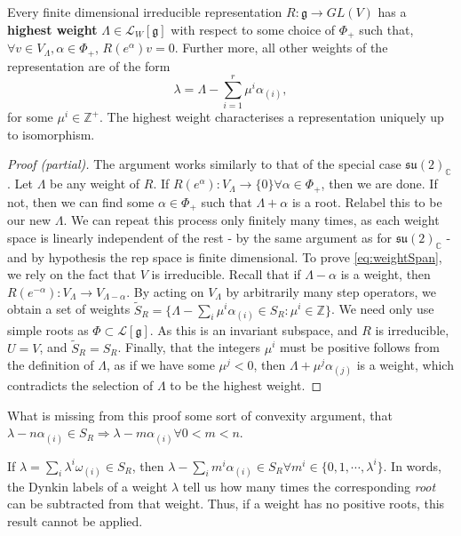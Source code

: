\documentclass[11pt,fleqn]{article}
\renewenvironment{prop}{\begin{pBox}\begin{propT}}{\end{propT}\end{pBox}}
\begin{document}
\begin{prop}
	Every finite dimensional irreducible representation $R:\mathfrak{g} \to GL(V)$ has a \textbf{highest weight} $\Lambda \in \mathcal{L}_W[\mathfrak{g}]$ with respect to some choice of $\Phi_+$ such that, $\forall v \in V_{\Lambda}, \alpha \in \Phi_+$, $R(e^\alpha) v = 0$. Further more, all other weights of the representation are of the form
		\begin{equation}\label{eq:weightSpan}
			\lambda = \Lambda - \sum_{i=1}^r \mu^i \alpha_{(i)},
		\end{equation}
	for some $\mu^i \in \mathbb{Z}^+$. The highest weight characterises a representation uniquely up to isomorphism.
\end{prop}
\begin{proof}[Proof (partial)]
	The argument works similarly to that of the special case $\mathfrak{su}(2)_\mathbb{C}$. Let $\Lambda$ be any weight of $R$. If $R(e^\alpha): V_\Lambda \to \{ 0\} \forall \alpha \in \Phi_+$, then we are done. If not, then we can find some $\alpha \in \Phi_+$ such that $\Lambda + \alpha$ is a root. Relabel this to be our new $\Lambda$. We can repeat this process only finitely many times, as each weight space is linearly independent of the rest - by the same argument as for $\mathfrak{su}(2)_\mathbb{C}$ - and by hypothesis the rep space is finite dimensional. To prove \eqref{eq:weightSpan}, we rely on the fact that $V$ is irreducible. Recall that if $\Lambda - \alpha$ is a weight, then $R(e^{-\alpha}) : V_\Lambda \to V_{\Lambda - \alpha}$. By acting on $V_\Lambda$ by arbitrarily many step operators, we obtain a set of weights $\tilde{S}_R = \{ \Lambda - \sum_i \mu^i \alpha_{(i)} \in S_R : \mu^i \in \mathbb{Z} \}$. We need only use simple roots as $\Phi \subset \mathcal{L}[\mathfrak{g}]$. As this is an invariant subspace, and $R$ is irreducible, $U = V$, and $\tilde{S}_R = S_R$. Finally, that the integers $\mu^i$ must be positive follows from the definition of $\Lambda$, as if we have some $\mu^j < 0$, then $\Lambda + \mu^j \alpha_{(j)}$ is a weight, which contradicts the selection of $\Lambda$ to be the highest weight.
\end{proof}
\begin{remark}
	What is missing from this proof some sort of convexity argument, that $\lambda - n \alpha_{(i)} \in S_R \Rightarrow \lambda - m \alpha_{(i)} \forall 0 < m < n$.
\end{remark}

\begin{prop}
	If $\lambda = \sum_i \lambda^i \omega_{(i)} \in S_R$, then $\lambda - \sum_i m^i \alpha_{(i)} \in S_R \forall m^i \in \{0, 1, \cdots, \lambda^i \}$. In words, the Dynkin labels of a weight $\lambda$ tell us how many times the corresponding \textit{root} can be subtracted from that weight. Thus, if a weight has no positive roots, this result cannot be applied.
\end{prop}
\end{document}
